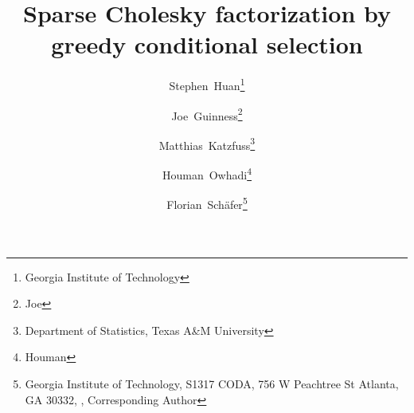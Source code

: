 \makeatletter
\newcommand*{\subalign}[1]{%
  \vcenter{%
    \Let@ \restore@math@cr \default@tag
    \baselineskip\fontdimen10 \scriptfont\tw@
    \advance\baselineskip\fontdimen12 \scriptfont\tw@
    \lineskip\thr@@\fontdimen8 \scriptfont\thr@@
    \lineskiplimit\lineskip
    \ialign{\hfil$\m@th\scriptstyle##$&$\m@th\scriptstyle{}##$\hfil\crcr
      #1\crcr
    }%
  }%
}
\makeatother

\renewcommand*{\algorithmicrequire}{\textbf{Input:}}
\renewcommand*{\algorithmicensure}{\textbf{Output:}}

\newcommand*{\creflastconjunction}{, and~}



\title{Sparse Cholesky factorization by greedy conditional selection}

\author{
  Stephen\ Huan\thanks{Georgia Institute of Technology} \and
  Joe\ Guinness\thanks{Joe} \and
  Matthias\ Katzfuss\thanks{Department of Statistics, Texas A\&M University} \and
  Houman\ Owhadi\thanks{Houman} \and
  Florian\ Sch{\"a}fer\thanks{Georgia Institute of Technology,
  S1317 CODA, 756 W Peachtree St Atlanta, GA 30332, \newline
  , Corresponding Author}
}

\newcommand*{\defeq}{\coloneqq}
\newcommand*{\BigO}{\mathcal{O}}
\newcommand*{\N}{\mathcal{N}}
\newcommand*{\SpSet}{\mathcal{S}}
\newcommand*{\GP}{\mathcal{GP}}
\newcommand*{\Loss}{\mathcal{L}}
\newcommand*{\Order}{\mathcal{I}}
\newcommand*{\Reverse}{\updownarrow}
\newcommand*{\I}{I}
\newcommand*{\J}{J}
\newcommand*{\V}{V}

\renewcommand*{\vec}[1]{\bm{#1}}
\newcommand*{\Id}{\text{Id}}

\newcommand*{\CM}{\Theta}
\newcommand*{\mean}{\mu}
\newcommand*{\var}{\sigma^2}
\newcommand*{\std}{\sigma}
\newcommand*{\K}{K}
\newcommand*{\Train}{\text{Tr}}
\newcommand*{\Pred}{\text{Pr}}

